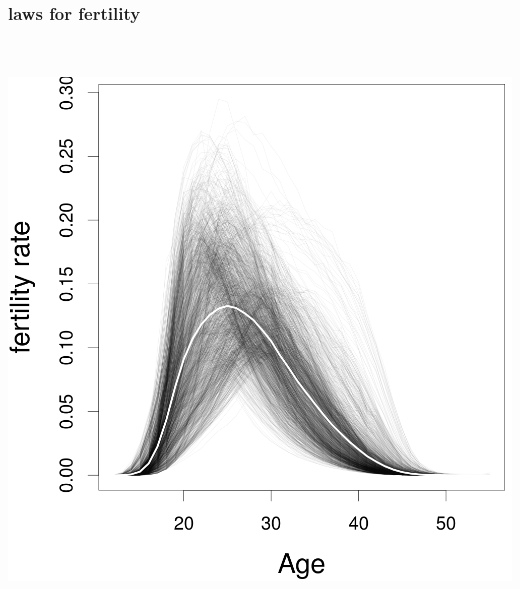 \documentclass[20pt]{beamer}
\begin{document}
\begin{frame}
\frametitle{laws for fertility}
\vspace{-1em}
\begin{center}
\includegraphics[height=6in]{Figures/Fertility2.png}
\end{center}
\end{frame}
\end{document}
